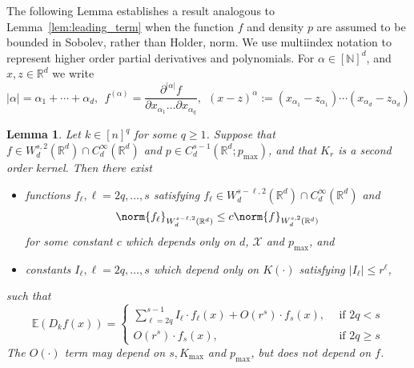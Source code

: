 \documentclass{article}
\newcommand{\Reals}{\mathbb{R}}
\newcommand{\abs}[1]{\left \lvert #1 \right \rvert}
\newcommand{\1}{\mathbf{1}}
\newcommand{\Rd}{\Reals^d}
\newcommand{\Xset}{\mathcal{X}}
\newcommand{\Ebb}{\mathbb{E}}
\theoremstyle{alden}
\theoremstyle{aldenthm}
\newtheorem{lemma}{Lemma}
\theoremstyle{definition}
\theoremstyle{remark}
\begin{document}
The following Lemma establishes a result analogous to Lemma~\ref{lem:leading_term} when the function $f$ and density $p$ are assumed to be bounded in Sobolev, rather than Holder, norm. We use multiindex notation to represent higher order partial derivatives and polynomials. For $\alpha \in [\mathbb{N}]^d$, and $x,z \in \Rd$ we write
\begin{equation*}
\abs{\alpha} = \alpha_1 + \cdots + \alpha_d,~~ f^{(\alpha)} = \frac{\partial^{\abs{\alpha}}f}{\partial x_{\alpha_1}\ldots \partial x_{\alpha_q}},~~ (x - z)^{\alpha} := (x_{\alpha_1} - z_{\alpha_1})\cdots(x_{\alpha_d} - z_{\alpha_d})
\end{equation*}
\begin{lemma}
	\label{lem:leading_term_sobolev}
	Let $k \in [n]^q$ for some $q \geq 1$. Suppose that $f \in W_d^{s,2}(\Rd) \cap C_d^{\infty}(\Rd)$ and $p \in C_d^{s - 1}(\Rd;p_{\max})$, and that $K_r$ is a second order kernel. Then there exist
	\begin{itemize}
		\item functions $f_{\ell}, \ell = 2q,\ldots,s$ satisfying $f_{\ell} \in W_d^{s - \ell,2}(\Rd) \cap C_d^{\infty}(\Rd)$ and
		\begin{equation*}
		\norm{f_{\ell}}_{W_d^{s - \ell,2}(\Rd)} \leq c \norm{f}_{W_d^{s,2}(\Rd)}
		\end{equation*}
		for some constant $c$ which depends only on $d$, $\Xset$ and $p_{\max}$, and 
		\item constants $I_{\ell},\ell = 2q,\ldots,s$ which depend only on $K(\cdot)$ satisfying $\abs{I_{\ell}} \leq r^{\ell}$,
	\end{itemize}
	such that
	\begin{equation}
	\label{eqn:leading_term_sobolev}
	\Ebb(D_kf(x)) =
	\begin{cases*}
	\sum_{\ell = 2q}^{s - 1} I_{\ell} \cdot f_{\ell}(x) +  O(r^{s}) \cdot f_{s}(x),~~& \textrm{if $2q < s$} \\
	O(r^{s}) \cdot f_{s}(x),~~& \textrm{if $2q \geq s$}
	\end{cases*}
	\end{equation}
	The $O(\cdot)$ term may depend on $s, K_{\max}$ and $p_{\max}$, but does not depend on $f$.
\end{lemma}
\end{document}
